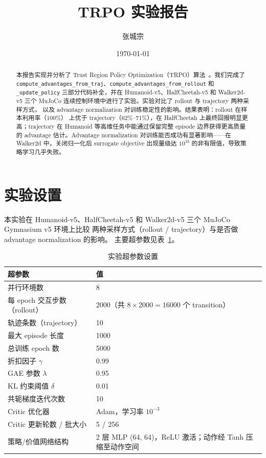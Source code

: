 \documentclass[12pt]{article}
\title{\textbf{\LARGE TRPO 实验报告}}
\author{\large 张城宗 \quad 241098117}
\date{\today}
\begin{document}
\maketitle
\thispagestyle{empty}
\vspace{0.5em}

\begin{abstract}
本报告实现并分析了 Trust Region Policy Optimization（TRPO）算法~\cite{trpo}。我们完成了
\texttt{compute\_advantages\_from\_traj}、\texttt{compute\_advantages\_from\_rollout} 和
\texttt{\_update\_policy} 三部分代码补全，并在 Humanoid-v5、HalfCheetah-v5 和 Walker2d-v5
三个 MuJoCo 连续控制环境中进行了实验。实验对比了 rollout 与 trajectory 两种采样方式，
以及 advantage normalization 对训练稳定性的影响。结果表明：rollout 在样本利用率（$100\%$）
上优于 trajectory（$62\%$--$71\%$），在 HalfCheetah 上最终回报明显更高；trajectory 在 Humanoid
等高维任务中能通过保留完整 episode 边界获得更高质量的 advantage 估计。Advantage normalization
对训练能否成功有显著影响——在 Walker2d 中，关闭归一化后 surrogate objective 出现量级达
$10^{33}$ 的非有限值，导致策略学习几乎失败。
\end{abstract}

\newpage

\section{实验设置}

本实验在 Humanoid-v5、HalfCheetah-v5 和 Walker2d-v5 三个 MuJoCo Gymnasium v5 环境上比较
两种采样方式（rollout / trajectory）与是否做 advantage normalization 的影响。
主要超参数见表~\ref{tab:hyperparams}。

\begin{table}[H]
\centering
\caption{实验超参数设置}
\label{tab:hyperparams}
\begin{tabular}{ll}
\toprule
超参数 & 值 \\
\midrule
并行环境数 & 8 \\
每 epoch 交互步数（rollout） & 2000（共 $8\times2000=16000$ 个 transition）\\
轨迹条数（trajectory） & 10 \\
最大 episode 长度 & 1000 \\
总训练 epoch 数 & 5000 \\
折扣因子 $\gamma$ & 0.99 \\
GAE 参数 $\lambda$ & 0.95 \\
KL 约束阈值 $\delta$ & 0.01 \\
共轭梯度迭代次数 & 10 \\
Critic 优化器 & Adam，学习率 $10^{-3}$ \\
Critic 更新轮数 / 批大小 & 5 / 256 \\
策略/价值网络结构 & 2 层 MLP (64, 64)，ReLU 激活；动作经 Tanh 压缩至动作空间 \\
\bottomrule
\end{tabular}
\end{table}
\end{document}
